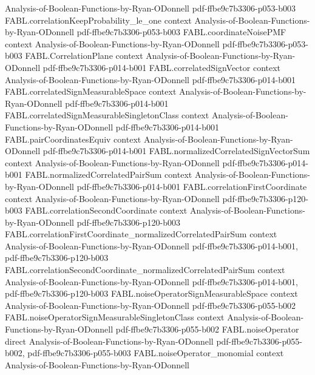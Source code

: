 \begin{theorem}
  {Analysis-of-Boolean-Functions-by-Ryan-ODonnell}
  {pdf-ffbe9c7b3306-p053-b003}
\proofstep
  {FABL.correlationKeepProbability_le_one}
  {context}
  {Analysis-of-Boolean-Functions-by-Ryan-ODonnell}
  {pdf-ffbe9c7b3306-p053-b003}
\proofstep
  {FABL.coordinateNoisePMF}
  {context}
  {Analysis-of-Boolean-Functions-by-Ryan-ODonnell}
  {pdf-ffbe9c7b3306-p053-b003}
\proofstep
  {FABL.CorrelationPlane}
  {context}
  {Analysis-of-Boolean-Functions-by-Ryan-ODonnell}
  {pdf-ffbe9c7b3306-p014-b001}
\proofstep
  {FABL.correlatedSignVector}
  {context}
  {Analysis-of-Boolean-Functions-by-Ryan-ODonnell}
  {pdf-ffbe9c7b3306-p014-b001}
\proofstep
  {FABL.correlatedSignMeasurableSpace}
  {context}
  {Analysis-of-Boolean-Functions-by-Ryan-ODonnell}
  {pdf-ffbe9c7b3306-p014-b001}
\proofstep
  {FABL.correlatedSignMeasurableSingletonClass}
  {context}
  {Analysis-of-Boolean-Functions-by-Ryan-ODonnell}
  {pdf-ffbe9c7b3306-p014-b001}
\proofstep
  {FABL.pairCoordinatesEquiv}
  {context}
  {Analysis-of-Boolean-Functions-by-Ryan-ODonnell}
  {pdf-ffbe9c7b3306-p014-b001}
\proofstep
  {FABL.normalizedCorrelatedSignVectorSum}
  {context}
  {Analysis-of-Boolean-Functions-by-Ryan-ODonnell}
  {pdf-ffbe9c7b3306-p014-b001}
\proofstep
  {FABL.normalizedCorrelatedPairSum}
  {context}
  {Analysis-of-Boolean-Functions-by-Ryan-ODonnell}
  {pdf-ffbe9c7b3306-p014-b001}
\proofstep
  {FABL.correlationFirstCoordinate}
  {context}
  {Analysis-of-Boolean-Functions-by-Ryan-ODonnell}
  {pdf-ffbe9c7b3306-p120-b003}
\proofstep
  {FABL.correlationSecondCoordinate}
  {context}
  {Analysis-of-Boolean-Functions-by-Ryan-ODonnell}
  {pdf-ffbe9c7b3306-p120-b003}
\proofstep
  {FABL.correlationFirstCoordinate_normalizedCorrelatedPairSum}
  {context}
  {Analysis-of-Boolean-Functions-by-Ryan-ODonnell}
  {pdf-ffbe9c7b3306-p014-b001,
    pdf-ffbe9c7b3306-p120-b003}
\proofstep
  {FABL.correlationSecondCoordinate_normalizedCorrelatedPairSum}
  {context}
  {Analysis-of-Boolean-Functions-by-Ryan-ODonnell}
  {pdf-ffbe9c7b3306-p014-b001,
    pdf-ffbe9c7b3306-p120-b003}
\proofstep
  {FABL.noiseOperatorSignMeasurableSpace}
  {context}
  {Analysis-of-Boolean-Functions-by-Ryan-ODonnell}
  {pdf-ffbe9c7b3306-p055-b002}
\proofstep
  {FABL.noiseOperatorSignMeasurableSingletonClass}
  {context}
  {Analysis-of-Boolean-Functions-by-Ryan-ODonnell}
  {pdf-ffbe9c7b3306-p055-b002}
\proofstep
  {FABL.noiseOperator}
  {direct}
  {Analysis-of-Boolean-Functions-by-Ryan-ODonnell}
  {pdf-ffbe9c7b3306-p055-b002,
    pdf-ffbe9c7b3306-p055-b003}
\proofstep
  {FABL.noiseOperator_monomial}
  {context}
  {Analysis-of-Boolean-Functions-by-Ryan-ODonnell}

\end{theorem}
